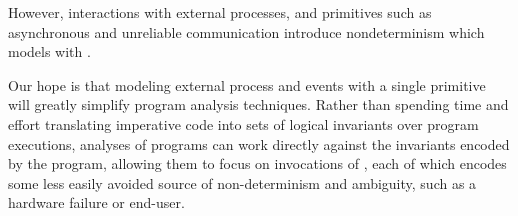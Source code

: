 However, interactions with external processes, and primitives such as
asynchronous and unreliable communication introduce nondeterminism
which \lang models with .  

Our hope is that modeling external process and events with a single
primitive will greatly simplify program analysis techniques.  Rather
than spending time and effort translating imperative code into sets of logical
invariants over program executions, analyses of \lang programs can
work directly against the invariants encoded by the program, allowing
them to focus on invocations of , each of which
encodes some less easily avoided source of non-determinism and
ambiguity, such as a hardware failure or end-user.

